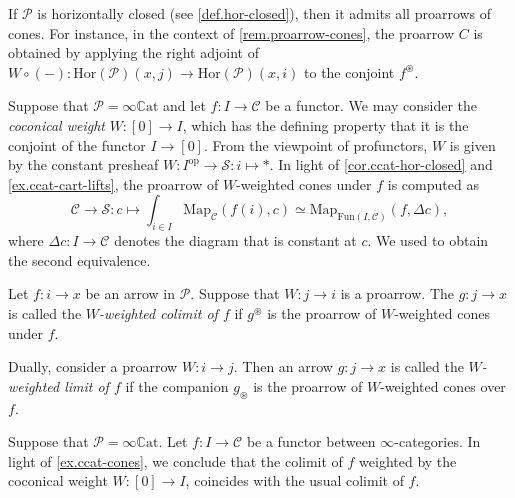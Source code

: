 \documentclass[a4paper, 11pt]{amsart}
\numberwithin{theorem}{section}
\theoremstyle{definition}
\newcommand{\op}{\mathrm{op}}
\newcommand{\map}{\mathrm{Map}}
\newcommand{\fun}{\mathrm{Fun}}
\renewcommand{\S}{\mathscr{S}}
\newcommand{\C}{\mathscr{C}}
\renewcommand{\P}{\mathscr{P}}
\newcommand{\Hor}{\mathrm{Hor}}
\newcommand{\CCAT}{\mathbb{C}\mathrm{at}}
\begin{document}
\begin{remark}
	If $\P$ is horizontally closed (see \cref{def.hor-closed}), then it admits all proarrows of cones. For instance, 
	in the context of \cref{rem.proarrow-cones}, the proarrow $C$ is obtained by applying the right adjoint of $W \circ (-) : \Hor(\P)(x,j) \to \Hor(\P)(x,i)$ 
	to the conjoint $f^\circledast$.
\end{remark}

\begin{example}\label{ex.ccat-cones}
Suppose that $\P = \infty\CCAT$ and let $f : I \rightarrow \C$ be a functor. We may consider the \textit{coconical weight} $W : [0] \rightarrow I$, which has the defining property 
that it is the conjoint of the functor $I \rightarrow [0]$. From the viewpoint of profunctors, 
$W$ is given by the constant presheaf $W : I^\op \rightarrow \S : i \mapsto \ast.$
In light of \cref{cor.ccat-hor-closed} and \cref{ex.ccat-cart-lifts}, the proarrow of $W$-weighted cones under $f$  is computed as
$$
\C \rightarrow \S : c \mapsto \int_{i \in I} \map_\C(f(i), c) \simeq \map_{\fun(I,\C)}(f, \Delta c),
$$
where  $\Delta c : I \rightarrow \C$ denotes the diagram that is constant at $c$. We used \cite[Proposition 5.1]{GepnerHaugsengNikolaus} to obtain the second equivalence.
\end{example}

\begin{definition}\label{def.weighted-colims}
	Let $f : i \rightarrow x$ be an arrow in $\P$. Suppose that $W : j \to i$ is a proarrow. The $g : j \rightarrow x$ 
	is called the \textit{$W$-weighted colimit of $f$} if
	$g^\circledast$ is the proarrow of $W$-weighted cones under $f$.

	Dually, consider a proarrow $W : i \to j$. Then an arrow $g : j\to x$ is called the \textit{$W$-weighted limit of $f$} if 
	the companion $g_\circledast$ is the proarrow of $W$-weighted cones over $f$.
\end{definition}

\begin{example}\label{ex.ccat-colims}
	Suppose that $\P = \infty\CCAT$. Let $f : I \rightarrow \C$ be a functor between $\infty$-categories. In light of \cref{ex.ccat-cones}, 
	we conclude that the colimit of $f$ weighted by the coconical weight $W : [0] \rightarrow I$, coincides with the usual colimit of $f$. 
\end{example}
\end{document}
